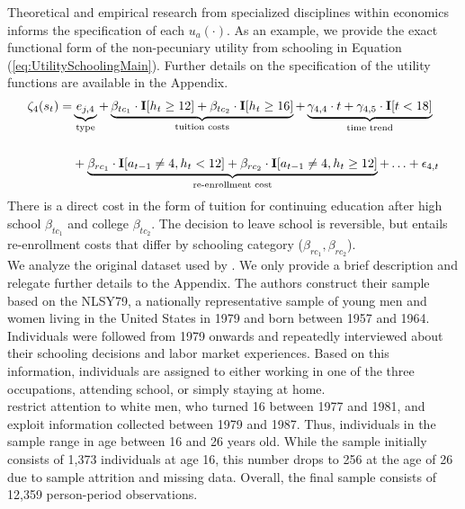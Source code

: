 \noindent Theoretical and empirical research from specialized disciplines within economics informs the specification of each $u_a(\cdot)$. As an example, we provide the exact functional form of the non-pecuniary utility from schooling in Equation (\ref{eq:UtilitySchoolingMain}). Further details on the specification of the utility functions are available in the Appendix.
%
\begin{align}\label{eq:UtilitySchoolingMain}
		\zeta_4(s_t)   = & \underbrace{e_{j,4}}_{\text{type}} + \underbrace{\beta_{tc_1} \cdot {\textbf{I}}[h_t \geq 12] + \beta_{tc_2} \cdot {\textbf{I}}[h_t \geq 16]}_{\text{tuition costs}}  + \underbrace{\gamma_{4,4} \cdot t + \gamma_{4,5} \cdot {\textbf{I}}[t < 18]}_{\text{time trend}}  \\[15pt]
	    							  & + \underbrace{\beta_{rc_1} \cdot {\textbf{I}}[a_{t-1} \neq 4, h_t < 12]   + \beta_{rc_2} \cdot {\textbf{I}}[a_{t-1} \neq 4, h_t \geq 12]}_{\text{re-enrollment cost}}  + \hdots + \epsilon_{4,t}\nonumber
\end{align}
%
There is a direct cost in the form of tuition for continuing education after high school $\beta_{tc_1}$ and college $\beta_{tc_2}$. The decision to leave school is reversible, but entails re-enrollment costs that differ by schooling category ($\beta_{rc_1}, \beta_{rc_2}$).\\

\noindent We analyze the original dataset used by \citet{Keane.1997}. We only provide a brief description and relegate further details to the Appendix. The authors construct their sample based on the NLSY79, a nationally representative sample of young men and women living in the United States in 1979 and born between 1957 and 1964. Individuals were followed from 1979 onwards and repeatedly interviewed about their schooling decisions and labor market experiences. Based on this information, individuals are assigned to either working in one of the three occupations, attending school, or simply staying at home.\\

\noindent \citet{Keane.1997} restrict attention to white men, who turned 16 between 1977 and 1981, and exploit information collected between 1979 and 1987. Thus, individuals in the sample range in age between 16 and 26 years old. While the sample initially consists of 1,373 individuals at age 16, this number drops to 256 at the age of 26 due to sample attrition and missing data. Overall, the final sample consists of 12,359 person-period observations.\\

